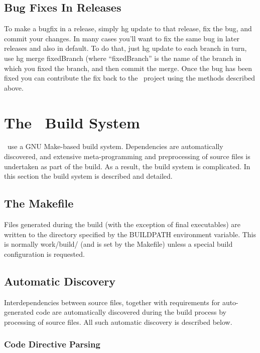 \subsection{Bug Fixes In Releases}

To make a bugfix in a release, simply {\normalfont \ttfamily hg update} to that release, fix the bug, and commit your changes. In many cases you'll want to fix the same bug in later releases and also in {\normalfont \ttfamily default}. To do that, just {\normalfont \ttfamily hg update} to each branch in turn, use {\normalfont \ttfamily hg merge fixedBranch} (where ``{\normalfont \ttfamily fixedBranch}'' is the name of the branch in which you fixed the branch, and then commit the merge. Once the bug has been fixed you can contribute the fix back to the \glc\ project using the methods described above.

\section{The \glc\ Build System}

\glc\ use a GNU Make-based build system. Dependencies are automatically discovered, and extensive meta-programming and preprocessing of source files is undertaken as part of the build. As a result, the build system is complicated. In this section the build system is described and detailed.

\subsection{The Makefile}

Files generated during the build (with the exception of final executables) are written to the directory specified by the {\normalfont \ttfamily BUILDPATH} environment variable. This is normally {\normalfont \ttfamily work/build/} (and is set by the {\normalfont \ttfamily Makefile}) unless a special build configuration is requested.

\subsection{Automatic Discovery}

Interdependencies between source files, together with requirements for auto-generated code are automatically discovered during the build process by processing of source files. All such automatic discovery is described below.

\subsubsection{Code Directive Parsing}\label{sec:buildDiscoveryDirectives}

